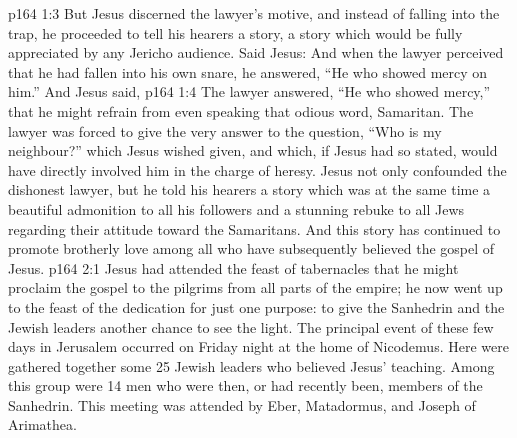 \vs p164 1:3 But Jesus discerned the lawyer’s motive, and instead of falling into the trap, he proceeded to tell his hearers a story, a story which would be fully appreciated by any Jericho audience. Said Jesus:  And when the lawyer perceived that he had fallen into his own snare, he answered, “He who showed mercy on him.” And Jesus said, 
\vs p164 1:4 The lawyer answered, “He who showed mercy,” that he might refrain from even speaking that odious word, Samaritan. The lawyer was forced to give the very answer to the question, “Who is my neighbour?” which Jesus wished given, and which, if Jesus had so stated, would have directly involved him in the charge of heresy. Jesus not only confounded the dishonest lawyer, but he told his hearers a story which was at the same time a beautiful admonition to all his followers and a stunning rebuke to all Jews regarding their attitude toward the Samaritans. And this story has continued to promote brotherly love among all who have subsequently believed the gospel of Jesus.
\vs p164 2:1 Jesus had attended the feast of tabernacles that he might proclaim the gospel to the pilgrims from all parts of the empire; he now went up to the feast of the dedication for just one purpose: to give the Sanhedrin and the Jewish leaders another chance to see the light. The principal event of these few days in Jerusalem occurred on Friday night at the home of Nicodemus. Here were gathered together some 25 Jewish leaders who believed Jesus’ teaching. Among this group were 14 men who were then, or had recently been, members of the Sanhedrin. This meeting was attended by Eber, Matadormus, and Joseph of Arimathea.
